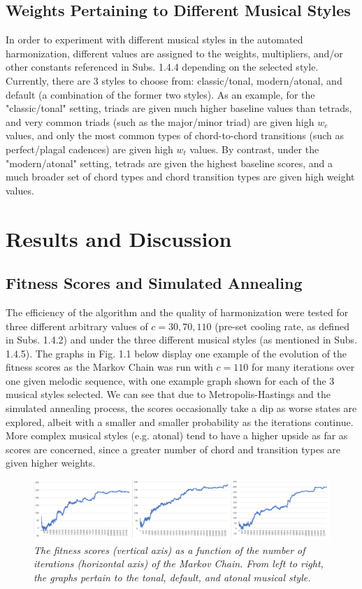 \documentclass[twoside]{article}
\begin{document}
	\subsection{Weights Pertaining to Different Musical Styles}
	In order to experiment with different musical styles in the automated harmonization, different values are assigned to the weights, multipliers, and/or other constants referenced in Subs. 1.4.4 depending on the selected style. Currently, there are 3 styles to choose from: classic/tonal, modern/atonal, and default (a combination of the former two styles). As an example, for the "classic/tonal" setting, triads are given much higher baseline values than tetrads, and very common triads (such as the major/minor triad) are given high $w_e$ values, and only the most common types of chord-to-chord transitions (such as perfect/plagal cadences) are given high $w_t$ values. By contrast, under the "modern/atonal" setting, tetrads are given the highest baseline scores, and a much broader set of chord types and chord transition types are given high weight values.
	\section{Results and Discussion}
	\subsection{Fitness Scores and Simulated Annealing}
	The efficiency of the algorithm and the quality of harmonization were tested for three different arbitrary values of $c=30,70,110$ (pre-set cooling rate, as defined in Subs. 1.4.2) and under the three different musical styles (as mentioned in Subs. 1.4.5). The graphs in Fig. 1.1 below display one example of the evolution of the fitness scores as the Markov Chain was run with $c=110$ for many iterations over one given melodic sequence, with one example graph shown for each of the 3 musical styles selected. We can see that due to Metropolis-Hastings and the simulated annealing process, the scores occasionally take a dip as worse states are explored, albeit with a smaller and smaller probability as the iterations continue. More complex musical styles (e.g. atonal) tend to have a higher upside as far as scores are concerned, since a greater number of chord and transition types are given higher weights.
	\begin{figure}[h]  %
		\begin{center}  
			\includegraphics[scale=0.45]{Fig1.png}  
			\caption{\small \sl The fitness scores (vertical axis) as a function of the number of iterations (horizontal axis) of the Markov Chain. From left to right, the graphs pertain to the tonal, default, and atonal musical style.}
		\end{center}  
	\end{figure}
\end{document}
